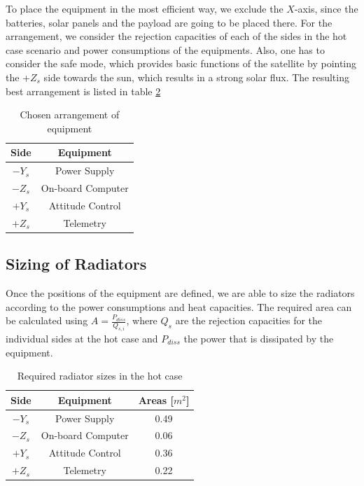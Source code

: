 To place the equipment in the most efficient way, we exclude the $X$-axis, since the batteries, solar panels and the payload are going to be placed there. For the arrangement, we consider the rejection capacities of each of the sides in the hot case scenario and power consumptions of the equipments. Also, one has to consider the safe mode, which provides basic functions of the satellite by pointing the +$Z_{s}$ side towards the sun, which results in a strong solar flux. The resulting best arrangement is listed in table \ref{tab:arrangement}

\begin{table}[H]
\centering
\begin{tabular}{ | c| c|}
\hline 
Side & Equipment  \\ \hline
$-Y_{s}$ & Power Supply  \\ \hline
$-Z_{s}$ &On-board Computer \\\hline
$+Y_{s}$ &Attitude Control \\ \hline
$+Z_{s}$ &Telemetry   \\ \hline
\end{tabular}
\caption{Chosen arrangement of equipment}
\label{tab:arrangement}
\end{table}


\subsection{Sizing of Radiators}
Once  the positions of the equipment are defined, we are able to size the radiators according to the power consumptions and heat capacities. The required area can be calculated using $A=\frac{P_{diss}}{Q_{s,i}}$, where $Q_{s}$ are the rejection capacities for the individual sides at the hot case and $P_{diss}$ the power that is dissipated by the equipment.


\begin{table}[H]
\centering
\begin{tabular}{ | c| c| c| }
\hline 
Side & Equipment  & Areas [$m^{2}$] \\ \hline
$-Y_{s}$ & Power Supply & 0.49   \\ \hline
$-Z_{s}$ &On-board Computer & 0.06   \\\hline
$+Y_{s}$ &Attitude Control &  0.36 \\ \hline
$+Z_{s}$ &Telemetry  &    0.22 \\ \hline
\end{tabular}
\caption{Required radiator sizes in the hot case}
\label{tab:arrangement}
\end{table}

